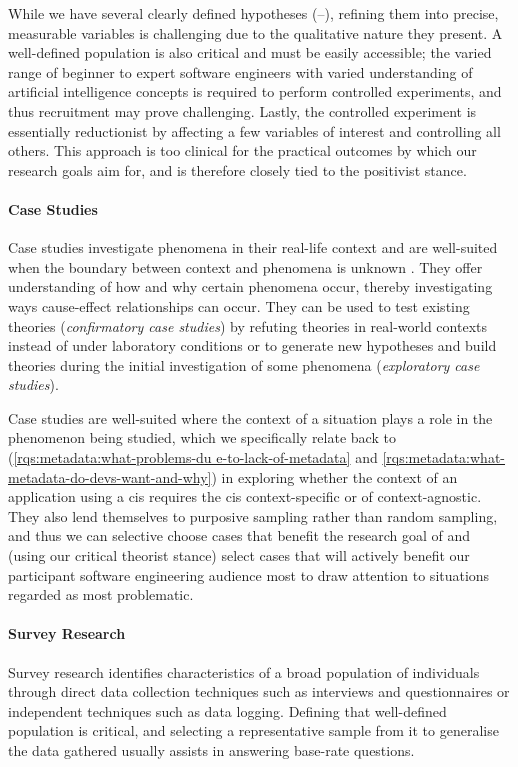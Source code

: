 While we have several clearly defined hypotheses (--), refining them into precise, measurable variables is challenging due to the qualitative nature they present. A well-defined population is also critical and must be easily accessible; the varied range of beginner to expert software engineers with varied understanding of artificial intelligence concepts is required to perform controlled experiments, and thus recruitment may prove challenging. Lastly, the controlled experiment is essentially reductionist by affecting a few variables of interest and controlling all others. This approach is too clinical for the practical outcomes by which our research goals aim for, and is therefore closely tied to the positivist stance.

\paragraph{Case Studies}
Case studies investigate phenomena in their real-life context and are well-suited when the boundary between context and phenomena is unknown \citep{Yin:2017tf}. They offer understanding of how and why certain phenomena occur, thereby investigating ways cause-effect relationships can occur. They can be used to test existing theories (\textit{confirmatory case studies}) by refuting theories in real-world contexts instead of under laboratory conditions or to generate new hypotheses and build theories during the initial investigation of some phenomena (\textit{exploratory case studies}).

Case studies are well-suited where the context of a situation plays a role in the phenomenon being studied, which we specifically relate back to  (\ref{rqs:metadata:what-problems-du                                                                e-to-lack-of-metadata} and \ref{rqs:metadata:what-metadata-do-devs-want-and-why}) in exploring whether the context of an application using a \gls{cis} requires the \gls{cis} context-specific or of context-agnostic. They also lend themselves to purposive sampling rather than random sampling, and thus we can selective choose cases that benefit the research goal of  and (using our critical theorist stance) select cases that will actively benefit our participant software engineering audience most to draw attention to situations regarded as most problematic.

\paragraph{Survey Research}
Survey research identifies characteristics of a broad population of individuals through direct data collection techniques such as interviews and questionnaires or independent techniques such as data logging. Defining that well-defined population is critical, and selecting a representative sample from it to generalise the data gathered usually assists in answering base-rate questions.

